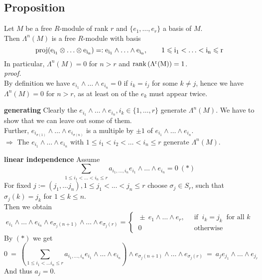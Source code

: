 \documentclass[12pt]{book}
\begin{document}
\begin{spacing}{1.3}
\subsection{Proposition} %
Let $M$ be a free $R$-module of rank $r$ and $\{e_1, \ldots, e_r\}$ a basis of $M$.\\
Then $\Lambda^n(M)$ is a free $R$-module with basis
$$ \rm{proj}(e_{i_1} \otimes \ldots \otimes e_{i_n}) =: e_{i_1}\wedge \ldots \wedge e_{i_n}, \qquad 1 \leqslant i_1 < \ldots < i_n \leqslant r$$
In particular, $\Lambda^n(M)=0$ for $n>r$ and $\rm{rank}\left(\Lambda^r(M)\right)=1$.\\
\textit{proof.}\\
By definition we have $e_{i_1} \wedge \ldots \wedge e_{i_n}=0$ if $i_k =i_j$ for some $k \neq j$, hence we have $\Lambda^n(M)=0$ for $n > r$, as at least on of the $e_k$ must appear twice.
\begin{compactitem}
\item[\textbf{generating}] Clearly the $e_{i_1} \wedge \ldots \wedge e_{i_n}, i_k \in \{1, \ldots, r\}$ generate $\Lambda^n(M)$. We have to show that we can leave out some of them.\\
Further, $e_{i_{\sigma(1)}} \wedge \ldots \wedge e_{i_{\sigma(n)}}$ is a multiple by $\pm 1 $ of $e_{i_1} \wedge \ldots \wedge e_{i_n}$.\\
$\Longrightarrow$ The $e_{i_1} \wedge \ldots \wedge e_{i_n}$ with $1 \leqslant i_1 < i_2 < \ldots < i_n \leqslant r$ generate $\Lambda^n(M)$. 
\item[\textbf{linear independence}] Assume
$$\sum_{1\leqslant i_1<...<i_n\leqslant r}a_{i_1, \ldots, i_n} e_{i_1} \wedge \ldots \wedge e_{i_n} = 0 \ (*)$$
For fixed $j:=(j_1, \ldots j_n), 1 \leqslant j_1 <...<j_n \leqslant r$ choose $\sigma_j \in S_r$, such that $\sigma_j(k)=j_k$ for $1 \leqslant k \leqslant n$. \\
Then we obtain 
$$e_{i_1} \wedge \ldots \wedge e_{i_n} \wedge e_{\sigma_j(n+1)} \wedge \ldots \wedge e_{\sigma_j(r)} = \begin{cases}\ \pm \ e_1 \wedge \ldots \wedge e_r, & \ \textrm{ if } \ i_k=j_k \ \textrm{ for all } k \\ \ 0 & \ \textrm{ otherwise } \end{cases}$$
By $(*)$ we get 
$$0\ = \ \left(\sum_{1 \leqslant i_1<\ldots i_n \leqslant r} a_{i_1,\ldots, i_n} e_{i_1} \wedge \ldots \wedge e_{i_n} \right) \wedge e_{\sigma_j(n+1)} \wedge \ldots \wedge e_{\sigma_j(r)} \ = \ a_j e_{j_1} \wedge \ldots \wedge e_{j_r}$$
And thus $a_j=0$. 
\end{compactitem}


\end{spacing}
\end{document}
